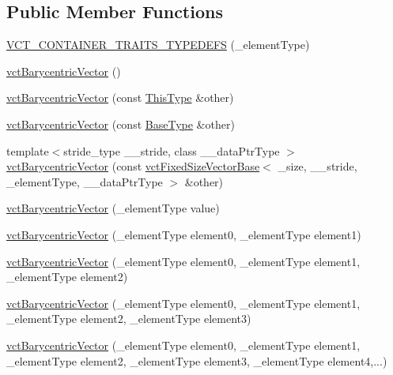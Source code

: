 \subsection*{Public Member Functions}
\begin{DoxyCompactItemize}
\item 
\hyperlink{classvct_barycentric_vector_a8b646f3c8363c436e762f7cba2e5d2c0}{V\-C\-T\-\_\-\-C\-O\-N\-T\-A\-I\-N\-E\-R\-\_\-\-T\-R\-A\-I\-T\-S\-\_\-\-T\-Y\-P\-E\-D\-E\-F\-S} (\-\_\-element\-Type)
\item 
\hyperlink{classvct_barycentric_vector_a06e12355c7d77f3b3057b0d6f7b86518}{vct\-Barycentric\-Vector} ()
\item 
\hyperlink{classvct_barycentric_vector_a46d83ab8117b92f9aefa3d0a1c3b394d}{vct\-Barycentric\-Vector} (const \hyperlink{classvct_barycentric_vector_af89123d5c607a28e2328d5d370dffb33}{This\-Type} \&other)
\item 
\hyperlink{classvct_barycentric_vector_a36adca65823ad1fa366a088e957c8b6d}{vct\-Barycentric\-Vector} (const \hyperlink{classvct_barycentric_vector_aae25bb56b435677441a223ea76745bfd}{Base\-Type} \&other)
\item 
{\footnotesize template$<$stride\-\_\-type \-\_\-\-\_\-stride, class \-\_\-\-\_\-data\-Ptr\-Type $>$ }\\\hyperlink{classvct_barycentric_vector_a29b3c331be53153b75ee3e7c088b375b}{vct\-Barycentric\-Vector} (const \hyperlink{classvct_fixed_size_vector_base}{vct\-Fixed\-Size\-Vector\-Base}$<$ \-\_\-size, \-\_\-\-\_\-stride, \-\_\-element\-Type, \-\_\-\-\_\-data\-Ptr\-Type $>$ \&other)
\item 
\hyperlink{classvct_barycentric_vector_a2e6c455fe90c510e16db4530756e92cd}{vct\-Barycentric\-Vector} (\-\_\-element\-Type value)
\item 
\hyperlink{classvct_barycentric_vector_a7098f480e5c2480892f31bbf052975e2}{vct\-Barycentric\-Vector} (\-\_\-element\-Type element0, \-\_\-element\-Type element1)
\item 
\hyperlink{classvct_barycentric_vector_a200a077eac6a5b914987fd2161ef60ea}{vct\-Barycentric\-Vector} (\-\_\-element\-Type element0, \-\_\-element\-Type element1, \-\_\-element\-Type element2)
\item 
\hyperlink{classvct_barycentric_vector_a9bd6627c056800269529e8cc64a8aaa5}{vct\-Barycentric\-Vector} (\-\_\-element\-Type element0, \-\_\-element\-Type element1, \-\_\-element\-Type element2, \-\_\-element\-Type element3)
\item 
\hyperlink{classvct_barycentric_vector_a41accc31d73ed3671315b393aabfba47}{vct\-Barycentric\-Vector} (\-\_\-element\-Type element0, \-\_\-element\-Type element1, \-\_\-element\-Type element2, \-\_\-element\-Type element3, \-\_\-element\-Type element4,...)

\end{DoxyCompactItemize}
